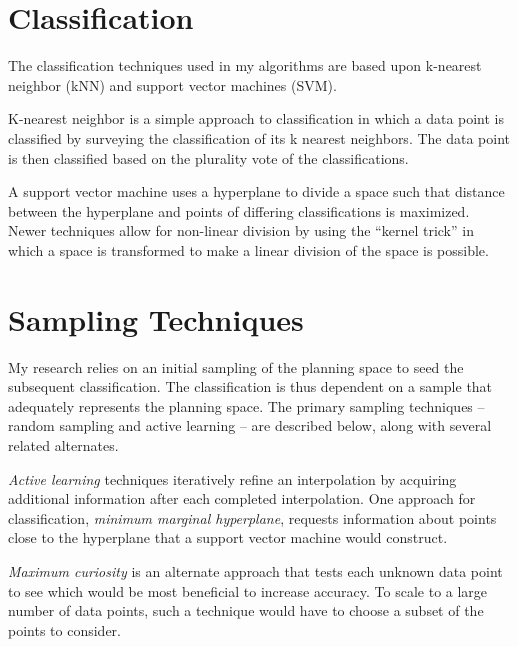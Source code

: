 \section{Classification}

The classification techniques used in my algorithms are based upon k-nearest neighbor (kNN) and support vector machines (SVM).

K-nearest neighbor \citep{cover67nearestneighbor} is a simple approach to classification in which a data point is classified by surveying the classification of its k nearest neighbors.  The data point is then classified based on the plurality vote of the classifications.  %

A support vector machine \citep{vapnik95svm} uses a hyperplane to divide a space such that distance between the hyperplane and points of differing classifications is maximized.  Newer techniques allow for non-linear division by using the ``kernel trick'' in which a space is transformed to make a linear division of the space is possible.




\section{Sampling Techniques}

My research relies on an initial sampling of the planning space to seed the subsequent classification.  The classification is thus dependent on a sample that adequately represents the planning space.  The primary sampling techniques -- random sampling and active learning -- are described below, along with several related alternates.



\textit{Active learning} \citep{Settles10activelearning} techniques iteratively refine an interpolation by acquiring additional information after each completed interpolation.  One approach for classification, \textit{minimum marginal hyperplane}, requests information about points close to the hyperplane that a support vector machine would construct.

\textit{Maximum curiosity} is an alternate approach that tests each unknown data point to see which would be most beneficial to increase accuracy.  To scale to a large number of data points, such a technique would have to choose a subset of the points to consider.


